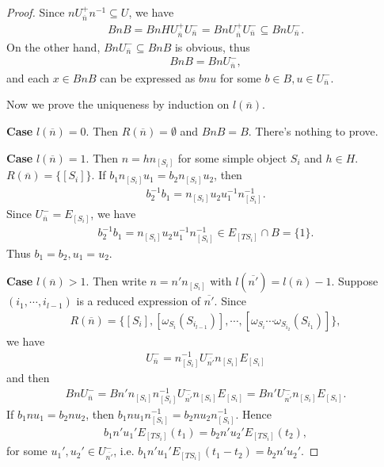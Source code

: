 \documentclass[12pt]{amsart}
\begin{document}
\begin{proof}
    Since $nU_{\overline{n}}^+ n^{-1} \subseteq  U$, we have
    \begin{align*}
        BnB = BnHU_{\overline{n}}^+U_{\overline{n}}^- = BnU_{\overline{n}}^+U_{\overline{n}}^- \subseteq  BnU_{\overline{n}}^-.
    \end{align*}
    On the other hand, $BnU_{\overline{n}}^- \subseteq  BnB$ is obvious, thus 
    \begin{align*}
        BnB = BnU_{\overline{n}}^-,
    \end{align*}
    and each $x\in BnB$ can be expressed as $bnu$ for some $b\in B,u\in U_{\overline{n}}^-$. 

    Now we prove the uniqueness by induction on $l(\overline{n})$.
    
    \textbf{Case} $l(\overline{n})=0$.  Then $R(\overline{n}) = \emptyset$ and $BnB = B$. There's nothing to prove. 

    \textbf{Case} $l(\overline{n})=1$.  Then $n=hn_{[S_i]}$ for some simple object $S_i$ and $h\in H$. 
    $R(\overline{n}) = \{ [S_i] \}$. 
    If $b_1 n_{[S_i]} u_1 = b_2 n_{[S_i]} u_2$, then 
    \begin{align*}
        b_2^{-1}b_1 = n_{[S_i]} u_2u_1^{-1} n_{[S_i]}^{-1}.
    \end{align*}
    Since $U_{\overline{n}}^- = E_{[S_i]}$, we have 
    \begin{align*}
        b_2^{-1}b_1 = n_{[S_i]} u_2u_1^{-1} n_{[S_i]}^{-1} \in E_{[TS_i]} \cap B = \{1\}.
    \end{align*}
    Thus $b_1=b_2,u_1=u_2$.

    \textbf{Case} $l(\overline{n})>1$.  Then write $n=n'n_{[S_i]}$ with $l(\overline{n'}) = l(\overline{n}) - 1$.
    Suppose $( i_1,\cdots,i_{l-1} )$ is a reduced expression of $\overline{n'}$.
    Since 
    \begin{align*}
      R(\overline{n}) = \{ [S_{i}], [\omega_{S_{i}}(S_{i_{l-1}})], \cdots,[\omega_{S_{i}} \cdots \omega_{S_{i_2}}(S_{i_1})]   \},
    \end{align*}
    we have 
    \begin{align*}
        U_{\overline{n}}^- = n_{[S_i]}^{-1} U_{\overline{n'}}^- n_{[S_i]} E_{[S_i]} 
    \end{align*}
    and then 
    \begin{align*}
        BnU_{\overline{n}}^- = Bn'n_{[S_i]} n_{[S_i]}^{-1} U_{\overline{n'}}^- n_{[S_i]} E_{[S_i]} = Bn' U_{\overline{n'}}^- n_{[S_i]} E_{[S_i]}.
    \end{align*}
    If $b_1nu_1 = b_2nu_2$, then $b_1nu_1n_{[S_i]}^{-1} = b_2nu_2n_{[S_i]}^{-1}$. 
    Hence
    \begin{align*}
        b_1n'u_1'E_{[TS_i]}(t_1) = b_2n'u_2' E_{[TS_i]}(t_2) ,
    \end{align*}
    for some $u_1',u_2' \in U_{\overline{n'}}^- $, i.e. $b_1n'u_1'E_{[TS_i]}(t_1-t_2) = b_2n'u_2' $.


\end{proof}
\end{document}
